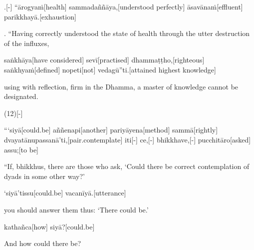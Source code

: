\begin{samepage}
.[-] “ārogyaṁ[health] sammadaññāya,[understood perfectly] āsavānaṁ[effluent] parikkhayā.[exhaustion]
\endgl
\nopagebreak
\linespread{0.5}
\begin{spacin}{0.2}
{. “Having correctly understood the state of health  through the utter destruction of the influxes,}
\end{spacin}
\vskip 12pt
\end{samepage}
\begin{samepage}
\begingl[glneveryline={\PaliGlossA,\PaliGlossB}]
saṅkhāya[have considered] sevī[practised] dhammaṭṭho,[righteous] saṅkhyaṁ[defined] nopeti[not] vedagū”ti.[attained highest knowledge]
\endgl
\nopagebreak
\linespread{0.5}
\begin{spacin}{0.2}
{\PaliGlossFT using with reflection, firm in the Dhamma, a master of knowledge cannot be designated.}
\end{spacin}
\vskip 12pt
\end{samepage}
\vskip 0.2in
\begin{samepage}
\begingl[glneveryline={\PaliGlossA,\PaliGlossB}]
(12)[-]
\endgl
\nopagebreak
\linespread{0.5}
\begin{spacin}{0.2}
{\PaliGlossFT [12. Agitation]}
\end{spacin}
\vskip 12pt
\end{samepage}
\begin{samepage}
\begingl[glneveryline={\PaliGlossA,\PaliGlossB}]
“‘siyā[could.be] aññenapi[another] pariyāyena[method] sammā[rightly] dvayatānupassanā’ti,[pair.contemplate] iti[-] ce,[-] bhikkhave,[-] pucchitāro[asked] assu;[to be]
\endgl
\nopagebreak
\linespread{0.5}
\begin{spacin}{0.2}
{\PaliGlossFT “If, bhikkhus, there are those who ask, ‘Could there be correct contemplation of dyads in some other way?’}
\end{spacin}
\vskip 12pt
\end{samepage}
\begin{samepage}
\begingl[glneveryline={\PaliGlossA,\PaliGlossB}]
‘siyā’tissu[could.be] vacanīyā.[utterance]
\endgl
\nopagebreak
\linespread{0.5}
\begin{spacin}{0.2}
{\PaliGlossFT you should answer them thus: ‘There could be.’}
\end{spacin}
\vskip 12pt
\end{samepage}
\begin{samepage}
\begingl[glneveryline={\PaliGlossA,\PaliGlossB}]
kathañca[how] siyā?[could.be]
\endgl
\nopagebreak
\linespread{0.5}
\begin{spacin}{0.2}
{\PaliGlossFT And how could there be?}
\end{spacin}
\vskip 12pt
\end{samepage}
